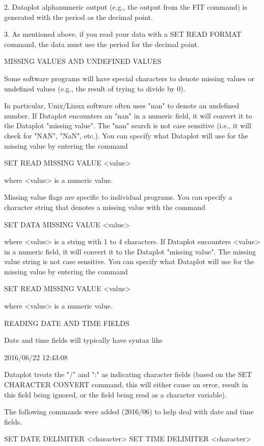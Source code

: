    2. Dataplot alphanumeric output (e.g., the output from the FIT
      command) is generated with the period as the decimal point.

   3. As mentioned above, if you read your data with a 
      SET READ FORMAT command, the data must use the period
      for the decimal point.


MISSING VALUES AND UNDEFINED VALUES

Some software programs will have special characters to denote
missing values or undefined values (e.g., the result of trying
to divide by 0).

In particular, Unix/Linux software often uses "nan" to denote an
undefined number.  If Dataplot encounters an "nan" in a numeric
field, it will convert it to the Dataplot "missing value".  The "nan"
search is not case sensitive (i.e., it will check for "NAN", "NaN",
etc.).  You can specify what Dataplot will use for the missing value
by entering the command

    SET READ MISSING VALUE  <value>

where <value> is a numeric value.

Missing value flags are specific to individual programs.  You can
specify a character string that denotes a missing value with the
command

    SET DATA MISSING VALUE <value>

where <value> is a string with 1 to 4 characters.  If Dataplot
encounters <value> in a numeric field, it will convert it to the
Dataplot "missing value".  The missing value string is not case
sensitive.  You can specify what Dataplot will use for the missing
value by entering the command

    SET READ MISSING VALUE  <value>

where <value> is a numeric value.

READING DATE AND TIME FIELDS

Date and time fields will typically have syntax like

   2016/06/22
   12:43:08

Dataplot treats the "/" and ":" as indicating character fields
(based on the SET CHARACTER CONVERT command, this will either cause
an error, result in this field being ignored, or the field being
read as a character variable).

The following commands were added (2016/06) to help deal with date and
time fields.

   SET DATE DELIMITER <character>
   SET TIME DELIMITER <character>

